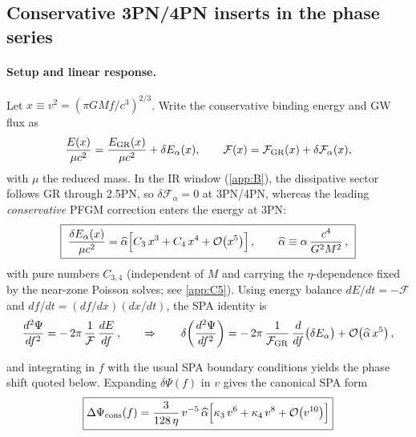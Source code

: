\documentclass{iopjournal}
\begin{document}
\subsection{Conservative 3PN/4PN inserts in the phase series}\label{app:E3}
\paragraph{Setup and linear response.}
Let $x\equiv v^{2}=(\pi GM f/c^{3})^{2/3}$. Write the conservative binding energy and GW flux as
\begin{equation}
\frac{E(x)}{\mu c^{2}}=\frac{E_{\rm GR}(x)}{\mu c^{2}}+\delta E_\alpha(x),\qquad
\mathcal F(x)=\mathcal F_{\rm GR}(x)+\delta\mathcal F_\alpha(x),
\label{eq:E3_EF_defs}
\end{equation}
with $\mu$ the reduced mass. In the IR window (\cref{app:B}), the dissipative sector follows GR through 2.5PN, so $\delta\mathcal F_\alpha=0$ at 3PN/4PN, whereas the leading \emph{conservative} PFGM correction enters the energy at 3PN:
\begin{equation}
\boxed{\ \frac{\delta E_\alpha(x)}{\mu c^{2}}
=\widehat\alpha\Big[C_{3}\,x^{3}+C_{4}\,x^{4}+\order{x^{5}}\Big]\,,\qquad
\widehat\alpha\equiv \alpha\,\frac{c^{4}}{G^{2}M^{2}}\,,\ }
\label{eq:E3_deltaE}
\end{equation}
with pure numbers $C_{3,4}$ (independent of $M$ and carrying the $\eta$-dependence fixed by the near-zone Poisson solves; see \cref{app:C5}). Using energy balance $dE/dt=-\mathcal F$ and $df/dt=(df/dx)(dx/dt)$, the SPA identity is
\begin{equation}
\frac{d^{2}\Psi}{df^{2}}
= -\,2\pi\,\frac{1}{\mathcal{F}}\,\frac{dE}{df}\,,
\qquad\Rightarrow\qquad
\delta\!\left(\frac{d^{2}\Psi}{df^{2}}\right)
= -\,2\pi\,\frac{1}{\mathcal{F}_{\rm GR}}\,\frac{d}{df}\bigl(\delta E_{\alpha}\bigr)
+ \order{\widehat{\alpha}\,x^{5}}\,,
\label{eq:E3_variation}
\end{equation}

and integrating in $f$ with the usual SPA boundary conditions yields the phase shift quoted below. Expanding $\delta\Psi(f)$ in $v$ gives the canonical SPA form
\begin{equation}
\boxed{\Delta\Psi_{\mathrm{cons}}(f)
= \frac{3}{128\,\eta}\,v^{-5}\,\widehat{\alpha}\Bigl[\kappa_{3}\,v^{6}
+ \kappa_{4}\,v^{8} + \order{v^{10}}\Bigr]}
\label{eq:E3_cons_series}
\end{equation}
\end{document}
